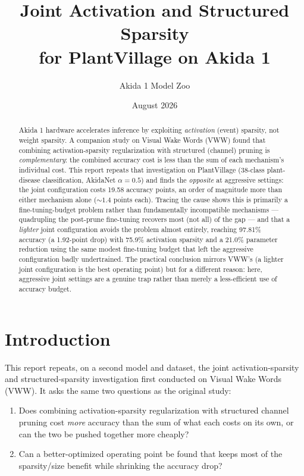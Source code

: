 \documentclass[11pt]{article}
\title{Joint Activation and Structured Sparsity\\ for PlantVillage on Akida 1}
\author{Akida 1 Model Zoo}
\date{August 2026}
\begin{document}
\maketitle

\begin{abstract}
Akida 1 hardware accelerates inference by exploiting \emph{activation} (event) sparsity, not weight sparsity. A companion study on Visual Wake Words (VWW) found that combining activation-sparsity regularization with structured (channel) pruning is \emph{complementary}: the combined accuracy cost is less than the sum of each mechanism's individual cost. This report repeats that investigation on PlantVillage (38-class plant-disease classification, AkidaNet $\alpha=0.5$) and finds the \emph{opposite} at aggressive settings: the joint configuration costs 19.58 accuracy points, an order of magnitude more than either mechanism alone (${\sim}1.4$ points each). Tracing the cause shows this is primarily a fine-tuning-budget problem rather than fundamentally incompatible mechanisms --- quadrupling the post-prune fine-tuning recovers most (not all) of the gap --- and that a \emph{lighter} joint configuration avoids the problem almost entirely, reaching 97.81\% accuracy (a 1.92-point drop) with 75.9\% activation sparsity and a 21.0\% parameter reduction using the same modest fine-tuning budget that left the aggressive configuration badly undertrained. The practical conclusion mirrors VWW's (a lighter joint configuration is the best operating point) but for a different reason: here, aggressive joint settings are a genuine trap rather than merely a less-efficient use of accuracy budget.
\end{abstract}

\tableofcontents

\section{Introduction}

This report repeats, on a second model and dataset, the joint activation-sparsity and structured-sparsity investigation first conducted on Visual Wake Words (VWW). It asks the same two questions as the original study:

\begin{enumerate}[label=(\roman*)]
    \item Does combining activation-sparsity regularization with structured channel pruning cost \emph{more} accuracy than the sum of what each costs on its own, or can the two be pushed together more cheaply?
    \item Can a better-optimized operating point be found that keeps most of the sparsity/size benefit while shrinking the accuracy drop?
\end{enumerate}
\end{document}
